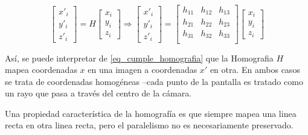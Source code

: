 \documentclass[a4paper,11pt,spanish]{article}
\begin{document}
\begin{equation}
  \begin{bmatrix}
  x'_i\\
  y'_i\\
  z'_i
  \end{bmatrix}=H
  \begin{bmatrix}
  x_i\\
  y_i \\
  z_i
  \end{bmatrix}\Longrightarrow
\begin{bmatrix}
  x'_i\\
  y'_i\\
  z'_i
  \end{bmatrix}=
  \begin{bmatrix}
  h_{11} & {h_12} & {h_13}\\
  h_{21} & {h_22} & {h_23}\\
  h_{31} & {h_32} & {h_33}\\
  \end{bmatrix}
\begin{bmatrix}
  x_i\\
  y_i \\
  z_i
  \end{bmatrix}
  \label{eq_cumple_homografia}
\end{equation}
  
Así, se puede interpretar de \eqref{eq_cumple_homografia} que la Homografia $H$ mapea coordenadas $x$ en una imagen a coordenadas $x'$ en otra. En ambos casos se trata de coordenadas homogéneas --cada punto de la pantalla es tratado como un rayo que pasa a través del centro de la cámara.

Una propiedad característica de la homografía es que siempre mapea una linea recta en otra linea recta, pero el paralelismo no es necesariamente preservado.
\end{document}
